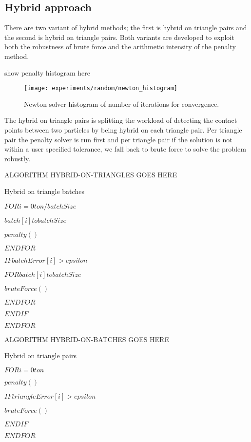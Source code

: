 \subsection{Hybrid approach}

There are two variant of hybrid methods; the first is hybrid on triangle pairs and the second is hybrid on triangle pairs. Both variants are developed to exploit both the robustness of brute force and the arithmetic intensity of the penalty method.

show penalty histogram here


\begin{figure}[!h]
\centering
\texttt{[image: experiments/random/newton\_histogram]} \protect\caption{\label{fig17}Newton solver histogram of number of iterations for convergence.}
\end{figure} 

The hybrid on triangle pairs is splitting the workload of detecting the contact points between two particles by being hybrid on each triangle pair. Per triangle pair the penalty solver is run first and per triangle pair if the solution is not within a user specified tolerance, we fall back to brute force to solve the problem robustly.  

ALGORITHM HYBRID-ON-TRIANGLES GOES HERE

\begin{algorithm}
 \caption{Hybrid on triangle batches} \label{algorithm:bf}
 \begin{algorithmic}[1]
	
	\State $FOR i = 0 to n/batchSize$

		\State $batch[i] to batchSize$		
					
			\State $penalty()$

		\State $ENDFOR$

		\State $IF batchError[i] > epsilon$

			\State $FOR batch[i] to batchSize$
	
				\State $bruteForce()$

			\State $ENDFOR$
	
		\State $ENDIF$
	
	\State $ENDFOR$
	
 \end{algorithmic}
\end{algorithm} 


ALGORITHM HYBRID-ON-BATCHES GOES HERE

\begin{algorithm}
 \caption{Hybrid on triangle pairs} \label{algorithm:bf}
 \begin{algorithmic}[1]
	
	\State $FOR i = 0 to n$
	
		\State $penalty()$

		\State $IF triangleError[i] > epsilon$

				\State $bruteForce()$
	
		\State $ENDIF$
	
	\State $ENDFOR$
	
 \end{algorithmic}
\end{algorithm} 


